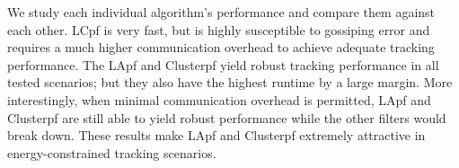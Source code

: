 \documentclass[10pt,letterpaper,final]{article}
\begin{document}
We study each individual algorithm's performance and compare them against each other. LCpf is very fast, but is highly susceptible to gossiping error and requires a much higher communication overhead to achieve adequate tracking performance. The LApf and Clusterpf yield robust tracking performance in all tested scenarios; but they also have the highest runtime by a large margin. More interestingly, when minimal communication overhead is permitted, LApf and Clusterpf are still able to yield robust performance while the other filters would break down. These results make LApf and Clusterpf extremely attractive in energy-constrained tracking scenarios. 



\end{document}
